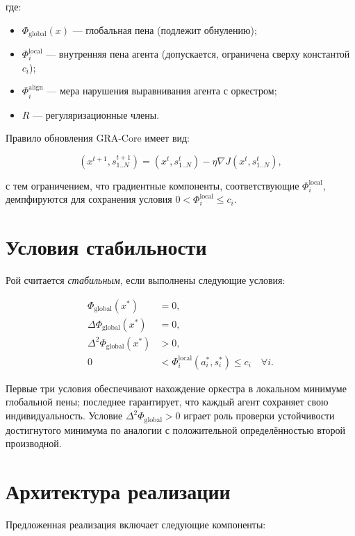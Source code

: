 \documentclass[twocolumn]{article}
\begin{document}
где:
\begin{itemize}
\item $\Phi_{\text{global}}(x)$ — глобальная пена (подлежит обнулению);
\item $\Phi_i^{\text{local}}$ — внутренняя пена агента (допускается, ограничена сверху константой $c_i$);
\item $\Phi_i^{\text{align}}$ — мера нарушения выравнивания агента с оркестром;
\item $R$ — регуляризационные члены.
\end{itemize}

Правило обновления GRA-Core имеет вид:

\begin{equation}
(x^{t+1}, s_{1..N}^{t+1}) = (x^t, s_{1..N}^t) - \eta \nabla J(x^t, s_{1..N}^t),
\end{equation}

с тем ограничением, что градиентные компоненты, соответствующие $\Phi_i^{\text{local}}$, демпфируются для сохранения условия $0 < \Phi_i^{\text{local}} \le c_i$.

\section{Условия стабильности}
Рой считается \emph{стабильным}, если выполнены следующие условия:

\begin{align}
\Phi_{\text{global}}(x^*) &= 0, \\
\Delta \Phi_{\text{global}}(x^*) &= 0, \\
\Delta^2 \Phi_{\text{global}}(x^*) &> 0, \\
0 &< \Phi_i^{\text{local}}(a_i^*, s_i^*) \le c_i \quad \forall i.
\end{align}

Первые три условия обеспечивают нахождение оркестра в локальном минимуме глобальной пены; последнее гарантирует, что каждый агент сохраняет свою индивидуальность. Условие $\Delta^2 \Phi_{\text{global}} > 0$ играет роль проверки устойчивости достигнутого минимума по аналогии с положительной определённостью второй производной.

\section{Архитектура реализации}
Предложенная реализация включает следующие компоненты:
\end{document}

